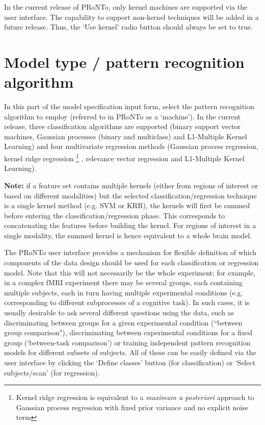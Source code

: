 In the current release of PRoNTo, only kernel machines are supported via the user interface. The capability to support non-kernel techniques will be added in a future release. Thus, the `Use kernel' radio button should always be set to true.

\section{Model type / pattern recognition algorithm}
In this part of the model specification input form, select the pattern recognition algorithm to employ (referred to in PRoNTo as a `machine'). In the current release, three classification algorithms are supported (binary support vector machines, Gaussian processes (binary and multiclass) and L1-Multiple Kernel Learning) and four multivariate regression methods (Gaussian process regression, kernel ridge regression 
\footnote{Kernel ridge regression is equivalent to a \emph{maximum a posteriori} approach to Gaussian process regression with fixed prior variance and no explicit noise term} , relevance vector regression and L1-Multiple Kernel Learning). 

\textbf{Note:} if a feature set contains multiple kernels (either from regions of interest or based on different modalities) but the selected classification/regression technique is a single kernel method (e.g. SVM or KRR), the kernels will first be summed before entering the classification/regression phase. This corresponds to concatenating the features before building the kernel. For regions of interest in a single modality, the summed kernel is hence equivalent to a whole brain model.

The PRoNTo user interface provides a mechanism for flexible definition of which components of the data design should be used for each classification or regression model. Note that this will not necessarily be the whole experiment; for example, in a complex fMRI experiment there may be several groups, each containing multiple subjects, each in turn having multiple experimental conditions (e.g. corresponding to
different subprocesses of a cognitive task). In such cases, it is usually desirable to ask several different questions using the data, such as discriminating between groups for a given experimental condition (``between group comparison"), discriminating between experimental conditions for a fixed group (`between-task comparison') or training independent pattern recognition models for different subsets of subjects. All of
these can be easily defined via the user interface by clicking the `Define classes' button (for classification) or `Select subjects/scan' (for regression).

